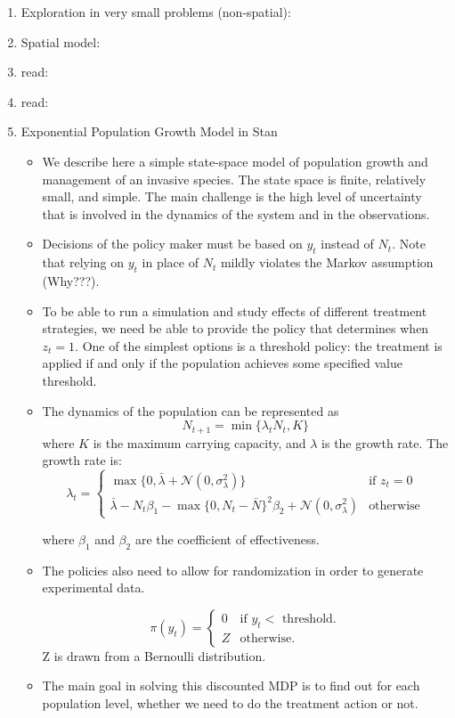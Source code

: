\documentclass{article}
\theoremstyle{remark}
\theoremstyle{remark}
\theoremstyle{remark}
\theoremstyle{remark}
\theoremstyle{remark}
\theoremstyle{remark}
\newcommand{\marek}[1]{\textcolor{Bittersweet}{#1}}
\begin{document}
\begin{enumerate}
\begin{itemize}
	\end{itemize}
	\item Exploration in very small problems (non-spatial): \cite{Hall2018,Taleghan2015}
	\item Spatial model: \cite{Nicol2017}
	\item \marek{read}: \cite{Albers2018}
	\item \marek{read}: \cite{Mehta2007}
	\item Exponential Population Growth Model in Stan
	\begin{itemize}
		\item We describe here a simple state-space model of population growth and management of an invasive species. The state space is finite, relatively small, and simple. The main challenge is the high level of uncertainty that is involved in the dynamics of the system and in the observations.
		\item Decisions of the policy maker must be based on $y_t$ instead of $N_t$. Note that relying on $y_t$ in place of $N_t$ mildly violates the Markov assumption (Why???).
		\item To be able to run a simulation and study effects of different treatment strategies, we need be able to provide the policy that determines when $z_t=1$. One of the simplest options is a threshold policy: the treatment is applied if and only if the population achieves some specified value threshold.
		\item The dynamics of the population can be represented as
		$$ N_{t+1} = \min \{\lambda_t N_t, K \} $$
		where $K$ is the maximum carrying capacity, and $\lambda$ is the growth rate. The growth rate is:
		\begin{equation}
		\lambda_t = \begin{cases}
				\max \{ 0, \bar{\lambda} + \mathcal{N}(0, \sigma_\lambda^2) \} & \text{if $z_t = 0 $} \\
				\bar{\lambda} - N_t \beta_1 - \max \{ 0, N_t - \bar{N}\}^2\beta_2 + \mathcal{N}(0, \sigma_\lambda^2) & \text{otherwise}
			\end{cases}
		\end{equation}

		where $\beta_1$ and $\beta_2$ are the coefficient of effectiveness.
		\item The policies also need to allow for randomization in order to generate experimental data.

		\begin{equation}
		  \pi(y_t)=\begin{cases}
		    0 & \text{if $y_t <$  threshold}.\\
		    Z & \text{otherwise}.
		  \end{cases}
		\end{equation}
		Z is drawn from a Bernoulli distribution.
		\item The main goal in solving this discounted MDP is to find out for each population level, whether we need to do the treatment action or not.



	\end{itemize}
\end{enumerate}
\end{document}
